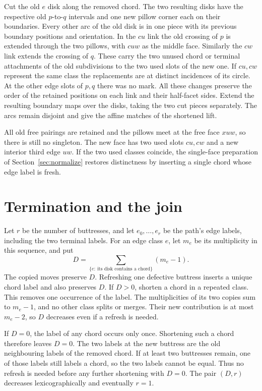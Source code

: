 \documentclass[11pt]{amsart}
\begin{document}
Cut the old \(e\) disk along the removed chord. The two resulting disks
have the respective old \(p\)-to-\(q\) intervals and one new pillow
corner each on their boundaries. Every other arc of the old disk is
in one piece with its previous boundary positions and orientation.
In the \(cu\) link the old
crossing of \(p\) is extended through the two pillows, with \(cuw\) as
the middle face. Similarly the \(cw\) link extends the crossing of
\(q\). These carry the two unused chord or terminal attachments of
the old subdivisions to the two used slots of the new one. If
\(cu,cw\) represent the same class the replacements are at distinct
incidences of its circle. At the other edge slots of \(p,q\) there was
no mark. All these changes preserve the order of the retained
positions on each link and their half-facet sides. Extend the
resulting boundary maps over the disks, taking the two cut pieces
separately. The arcs remain disjoint and give the affine matches of
the shortened lift.

All old free pairings are retained and the pillows meet at the
free face \(xuw\), so there is still no singleton. The new face has two
used slots \(cu,cw\) and a new interior third edge \(uw\). If the two
used classes coincide, the single-face preparation of
Section~\ref{sec:normalize} restores distinctness by inserting a single
chord whose edge label is fresh.

\section{Termination and the join}

Let \(r\) be the number of buttresses, and let \(e_0,\ldots,e_r\) be the
path's edge labels, including the two terminal labels. For an edge
class \(e\), let \(m_e\) be its multiplicity in this sequence, and put
\[
              D=\sum_{\{e:\ \text{its disk contains a chord}\}}(m_e-1).
\]
The copied moves preserve \(D\). Refreshing one defective buttress
inserts a unique chord label and also preserves \(D\). If \(D>0\),
shorten a chord in a repeated class. This removes one occurrence of the
label. The multiplicities of its two copies sum to \(m_e-1\), and no other
class splits or merges. Their new contribution is at most \(m_e-2\),
so \(D\) decreases even if a refresh is needed.

If \(D=0\), the label of any chord occurs only once. Shortening such a
chord therefore leaves \(D=0\). The two labels at the new buttress are
the old neighbouring labels of the removed chord. If at least two
buttresses remain, one of those labels still labels a chord, so the
two labels cannot be equal. Thus no refresh is needed before any
further shortening with \(D=0\). The pair \((D,r)\) decreases
lexicographically and eventually \(r=1\).
\end{document}
